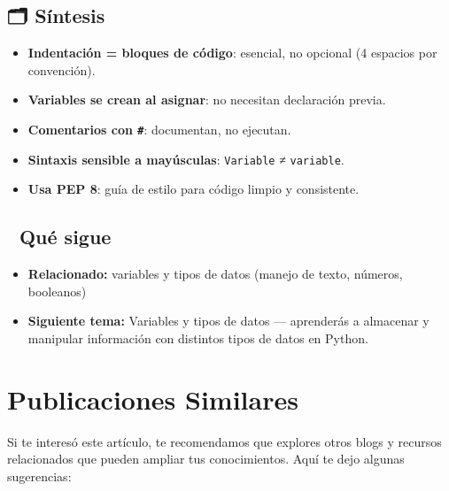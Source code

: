 \documentclass[
  doc,
  floatsintext,
  longtable,
  a4paper,
  nolmodern,
  notxfonts,
  notimes,
  12pt,
  colorlinks=true,linkcolor=blue,citecolor=blue,urlcolor=blue]{apa7}
\providecommand{\tightlist}{%
  \setlength{\itemsep}{0pt}\setlength{\parskip}{0pt}}
\begin{document}
\subsection{🗂️ Síntesis}\label{suxedntesis}

\begin{itemize}
\tightlist
\item
  \textbf{Indentación = bloques de código}: esencial, no opcional (4
  espacios por convención).
\item
  \textbf{Variables se crean al asignar}: no necesitan declaración
  previa.
\item
  \textbf{Comentarios con \texttt{\#}}: documentan, no ejecutan.
\item
  \textbf{Sintaxis sensible a mayúsculas}: \texttt{Variable} ≠
  \texttt{variable}.
\item
  \textbf{Usa PEP 8}: guía de estilo para código limpio y consistente.
\end{itemize}

\subsection{🔗 Qué sigue}\label{quuxe9-sigue}

\begin{itemize}
\tightlist
\item
  \textbf{Relacionado:} variables y tipos de datos (manejo de texto,
  números, booleanos)
\item
  \textbf{Siguiente tema:} Variables y tipos de datos --- aprenderás a
  almacenar y manipular información con distintos tipos de datos en
  Python.
\end{itemize}

\section{Publicaciones Similares}\label{publicaciones-similares}

Si te interesó este artículo, te recomendamos que explores otros blogs y
recursos relacionados que pueden ampliar tus conocimientos. Aquí te dejo
algunas sugerencias:
\end{document}
